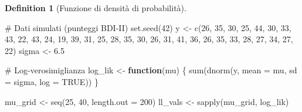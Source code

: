 \documentclass[
  letterpaper,
  DIV=11,
  numbers=noendperiod,
  oneside]{scrreprt}
\newenvironment{Shaded}{\begin{snugshade}}{\end{snugshade}}
\newcommand{\AttributeTok}[1]{\textcolor[rgb]{0.40,0.45,0.13}{#1}}
\newcommand{\CommentTok}[1]{\textcolor[rgb]{0.37,0.37,0.37}{#1}}
\newcommand{\ConstantTok}[1]{\textcolor[rgb]{0.56,0.35,0.01}{#1}}
\newcommand{\ControlFlowTok}[1]{\textcolor[rgb]{0.00,0.23,0.31}{\textbf{#1}}}
\newcommand{\DecValTok}[1]{\textcolor[rgb]{0.68,0.00,0.00}{#1}}
\newcommand{\FloatTok}[1]{\textcolor[rgb]{0.68,0.00,0.00}{#1}}
\newcommand{\FunctionTok}[1]{\textcolor[rgb]{0.28,0.35,0.67}{#1}}
\newcommand{\NormalTok}[1]{\textcolor[rgb]{0.00,0.23,0.31}{#1}}
\newcommand{\OtherTok}[1]{\textcolor[rgb]{0.00,0.23,0.31}{#1}}
\theoremstyle{definition}
\theoremstyle{plain}
\theoremstyle{definition}
\newtheorem{definition}{Definition}[chapter]
\theoremstyle{remark}
\begin{document}
\begin{definition}[Funzione di densità di
probabilità]
\begin{Shaded}
\begin{Highlighting}[]
\CommentTok{\# Dati simulati (punteggi BDI{-}II)}
\FunctionTok{set.seed}\NormalTok{(}\DecValTok{42}\NormalTok{)}
\NormalTok{y }\OtherTok{\textless{}{-}} \FunctionTok{c}\NormalTok{(}\DecValTok{26}\NormalTok{, }\DecValTok{35}\NormalTok{, }\DecValTok{30}\NormalTok{, }\DecValTok{25}\NormalTok{, }\DecValTok{44}\NormalTok{, }\DecValTok{30}\NormalTok{, }\DecValTok{33}\NormalTok{, }\DecValTok{43}\NormalTok{, }\DecValTok{22}\NormalTok{, }\DecValTok{43}\NormalTok{, }\DecValTok{24}\NormalTok{, }\DecValTok{19}\NormalTok{, }\DecValTok{39}\NormalTok{, }\DecValTok{31}\NormalTok{, }\DecValTok{25}\NormalTok{,}
       \DecValTok{28}\NormalTok{, }\DecValTok{35}\NormalTok{, }\DecValTok{30}\NormalTok{, }\DecValTok{26}\NormalTok{, }\DecValTok{31}\NormalTok{, }\DecValTok{41}\NormalTok{, }\DecValTok{36}\NormalTok{, }\DecValTok{26}\NormalTok{, }\DecValTok{35}\NormalTok{, }\DecValTok{33}\NormalTok{, }\DecValTok{28}\NormalTok{, }\DecValTok{27}\NormalTok{, }\DecValTok{34}\NormalTok{, }\DecValTok{27}\NormalTok{, }\DecValTok{22}\NormalTok{)}
\NormalTok{sigma }\OtherTok{\textless{}{-}} \FloatTok{6.5}

\CommentTok{\# Log{-}verosimiglianza}
\NormalTok{log\_lik }\OtherTok{\textless{}{-}} \ControlFlowTok{function}\NormalTok{(mu) \{}
  \FunctionTok{sum}\NormalTok{(}\FunctionTok{dnorm}\NormalTok{(y, }\AttributeTok{mean =}\NormalTok{ mu, }\AttributeTok{sd =}\NormalTok{ sigma, }\AttributeTok{log =} \ConstantTok{TRUE}\NormalTok{))}
\NormalTok{\}}

\NormalTok{mu\_grid }\OtherTok{\textless{}{-}} \FunctionTok{seq}\NormalTok{(}\DecValTok{25}\NormalTok{, }\DecValTok{40}\NormalTok{, }\AttributeTok{length.out =} \DecValTok{200}\NormalTok{)}
\NormalTok{ll\_vals }\OtherTok{\textless{}{-}} \FunctionTok{sapply}\NormalTok{(mu\_grid, log\_lik)}


\end{Highlighting}
\end{Shaded}
\end{definition}
\end{document}
